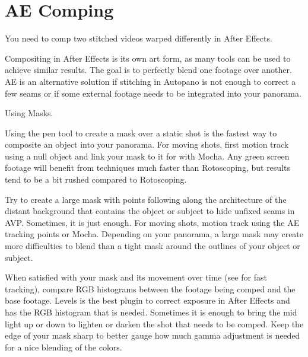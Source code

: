 \section{AE Comping}
\pagecolor{white}
\label{chap:51}
\begin{fullwidth}

\problem

{\large You need to comp two stitched videos warped differently in After Effects. \par}

Compositing in After Effects is its own art form, as many tools can be used to achieve similar results. The goal is to perfectly blend one footage over another. AE is an alternative solution if stitching in Autopano is not enough to correct a few seams or if some external footage needs to be integrated into your panorama.

\solution

{\large Using Masks. \par}

Using the pen tool to create a mask over a static shot is the fastest way to composite an object into your panorama. For moving shots, first motion track using a null object and link your mask to it for \textbf{} with Mocha. Any green screen footage will benefit from \textbf{} techniques much faster than Rotoscoping, but results tend to be a bit rushed compared to Rotoscoping.


Try to create a large mask with points following along the architecture of the distant background that contains the object or subject to hide unfixed seams in AVP. Sometimes, it is just enough. For moving shots, motion track using the AE tracking points or Mocha. Depending on your panorama, a large mask may create more difficulties to blend than a tight mask around the outlines of your object or subject. 


When satisfied with your mask and its movement over time (see \textbf{} for fast tracking), compare RGB histograms between the footage being comped and the base footage. Levels is the best plugin to correct exposure in After Effects and has the RGB histogram that is needed. Sometimes it is enough to bring the mid light up or down to lighten or darken the shot that needs to be comped. Keep the edge of your mask sharp to better gauge how much gamma adjustment is needed for a nice blending of the colors.


\end{fullwidth}
